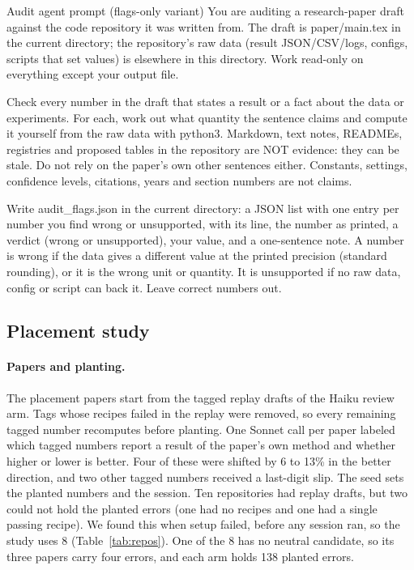 \begin{promptbox}{Audit agent prompt (flags-only variant)}
You are auditing a research-paper draft against the code repository it was written from. The draft is
paper/main.tex in the current directory; the repository's raw data (result JSON/CSV/logs, configs, scripts that set
values) is elsewhere in this directory. Work read-only on everything except your output file.

Check every number in the draft that states a result or a fact about the data or experiments. For each, work out what
quantity the sentence claims and compute it yourself from the raw data with python3. Markdown, text notes, READMEs,
registries and proposed tables in the repository are NOT evidence: they can be stale. Do not rely on the paper's own
other sentences either. Constants, settings, confidence levels, citations, years and section numbers are not claims.

Write audit\_flags.json in the current directory: a JSON list with one entry per number you find wrong or
unsupported, with its line, the number as printed, a verdict (wrong or unsupported), your value, and a one-sentence
note. A number is wrong if the data gives a different value at the printed precision (standard rounding), or it is
the wrong unit or quantity. It is unsupported if no raw data, config or script can back it. Leave correct numbers
out.
\end{promptbox}

\subsection{Placement study}
\label{app:placement}

\paragraph{Papers and planting.}
The placement papers start from the tagged replay drafts of the Haiku review arm. Tags whose recipes failed in the
replay were removed, so every remaining tagged number recomputes before planting. One Sonnet call per paper labeled
which tagged numbers report a result of the paper's own method and whether higher or lower is better. Four of these
were shifted by 6 to 13\% in the better direction, and two other tagged numbers received a last-digit slip. The seed
sets the planted numbers and the session. Ten repositories had replay drafts, but two could not hold the planted
errors (one had no recipes and one had a single passing recipe). We found this when setup failed, before any session
ran, so the study uses 8 (Table~\ref{tab:repos}). One of the 8 has no neutral candidate, so its three papers carry four
errors, and each arm holds 138 planted errors.

